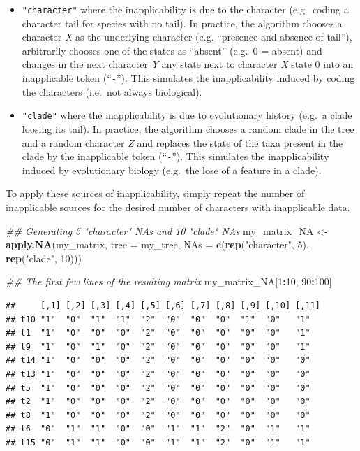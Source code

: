 \documentclass[]{book}
\newenvironment{Shaded}{\begin{snugshade}}{\end{snugshade}}
\newcommand{\CommentTok}[1]{\textcolor[rgb]{0.56,0.35,0.01}{\textit{#1}}}
\newcommand{\DataTypeTok}[1]{\textcolor[rgb]{0.13,0.29,0.53}{#1}}
\newcommand{\DecValTok}[1]{\textcolor[rgb]{0.00,0.00,0.81}{#1}}
\newcommand{\KeywordTok}[1]{\textcolor[rgb]{0.13,0.29,0.53}{\textbf{#1}}}
\newcommand{\NormalTok}[1]{#1}
\newcommand{\OperatorTok}[1]{\textcolor[rgb]{0.81,0.36,0.00}{\textbf{#1}}}
\newcommand{\StringTok}[1]{\textcolor[rgb]{0.31,0.60,0.02}{#1}}
\providecommand{\tightlist}{%
  \setlength{\itemsep}{0pt}\setlength{\parskip}{0pt}}
\begin{document}
\begin{itemize}
\tightlist
\item
  \texttt{"character"} where the inapplicability is due to the character (e.g.~coding a character tail for species with no tail).
  In practice, the algorithm chooses a character \emph{X} as the underlying character (e.g. ``presence and absence of tail''), arbitrarily chooses one of the states as ``absent'' (e.g.~0 = absent) and changes in the next character \emph{Y} any state next to character \emph{X} state 0 into an inapplicable token (``\texttt{-}'').
  This simulates the inapplicability induced by coding the characters (i.e.~not always biological).
\item
  \texttt{"clade"} where the inapplicability is due to evolutionary history (e.g.~a clade loosing its tail).
  In practice, the algorithm chooses a random clade in the tree and a random character \emph{Z} and replaces the state of the taxa present in the clade by the inapplicable token (``\texttt{-}'').
  This simulates the inapplicability induced by evolutionary biology (e.g.~the lose of a feature in a clade).
\end{itemize}

To apply these sources of inapplicability, simply repeat the number of inapplicable sources for the desired number of characters with inapplicable data.

\begin{Shaded}
\begin{Highlighting}[]
\CommentTok{## Generating 5 "character" NAs and 10 "clade" NAs}
\NormalTok{my_matrix_NA <-}\StringTok{ }\KeywordTok{apply.NA}\NormalTok{(my_matrix, }\DataTypeTok{tree =}\NormalTok{ my_tree,}
                         \DataTypeTok{NAs =} \KeywordTok{c}\NormalTok{(}\KeywordTok{rep}\NormalTok{(}\StringTok{"character"}\NormalTok{, }\DecValTok{5}\NormalTok{),}
                                 \KeywordTok{rep}\NormalTok{(}\StringTok{"clade"}\NormalTok{, }\DecValTok{10}\NormalTok{)))}

\CommentTok{## The first few lines of the resulting matrix}
\NormalTok{my_matrix_NA[}\DecValTok{1}\OperatorTok{:}\DecValTok{10}\NormalTok{, }\DecValTok{90}\OperatorTok{:}\DecValTok{100}\NormalTok{]}
\end{Highlighting}
\end{Shaded}

\begin{verbatim}
##     [,1] [,2] [,3] [,4] [,5] [,6] [,7] [,8] [,9] [,10] [,11]
## t10 "1"  "0"  "1"  "1"  "2"  "0"  "0"  "0"  "1"  "0"   "1"  
## t1  "1"  "0"  "0"  "0"  "2"  "0"  "0"  "0"  "0"  "0"   "1"  
## t9  "1"  "0"  "1"  "0"  "2"  "0"  "0"  "0"  "0"  "0"   "1"  
## t14 "1"  "0"  "0"  "0"  "2"  "0"  "0"  "0"  "0"  "0"   "0"  
## t13 "1"  "0"  "0"  "0"  "2"  "0"  "0"  "0"  "0"  "0"   "0"  
## t5  "1"  "0"  "0"  "0"  "2"  "0"  "0"  "0"  "0"  "0"   "0"  
## t2  "1"  "0"  "0"  "0"  "2"  "0"  "0"  "0"  "0"  "0"   "0"  
## t8  "1"  "0"  "0"  "0"  "2"  "0"  "0"  "0"  "0"  "0"   "0"  
## t6  "0"  "1"  "1"  "0"  "0"  "1"  "1"  "2"  "0"  "1"   "1"  
## t15 "0"  "1"  "1"  "0"  "0"  "1"  "1"  "2"  "0"  "1"   "1"
\end{verbatim}
\end{document}
